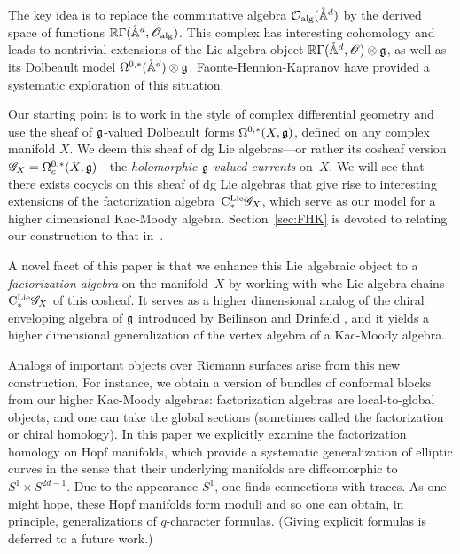 The key idea is to replace the commutative algebra $\mathcal O_{\rm alg}(\mathring{\mathbb A}^{d})$ by the derived space of functions $\mathbb R \Gamma(\mathring{\mathbb A}^{d}, \mathscr O_{\rm alg})$. 
This complex has interesting cohomology and leads to nontrivial extensions of the Lie algebra object $\mathbb R \Gamma(\mathring{\mathbb A}^{d}, \mathscr O) \otimes \mathfrak g$, as well as its Dolbeault model $\Omega^{0,*}(\mathring{\mathbb A}^d) \otimes \mathfrak g$.
Faonte-Hennion-Kapranov \cite{FHK} have provided a systematic exploration of this situation.

Our starting point is to work in the style of complex differential geometry and use the sheaf of $\mathfrak g$-valued Dolbeault forms $\Omega^{0,*}(X, \mathfrak g)$, defined on any complex manifold $X$. 
We deem this sheaf of dg Lie algebras---or rather its cosheaf version $\mathscr G_X = \Omega^{0,*}_c(X, \mathfrak g)$---the {\em holomorphic $\mathfrak g$-valued currents} on~$X$. 
We will see that there exists cocycls on this sheaf of dg Lie algebras that give rise to interesting extensions of the factorization algebra~${\rm C}^{\rm Lie}_*\mathscr G_X$,
which serve as our model for a higher dimensional Kac-Moody algebra. 
Section~\ref{sec:FHK} is devoted to relating our construction to that in~\cite{FHK}.

A novel facet of this paper is that we enhance this Lie algebraic object to a {\em factorization algebra} on the manifold~$X$
by working with whe Lie algebra chains ${\rm C}^{\rm Lie}_*\mathscr G_X$ of this cosheaf.
It serves as a higher dimensional analog of the chiral enveloping algebra of $\mathfrak g$ introduced by Beilinson and Drinfeld \cite{BD}, 
and it yields a higher dimensional generalization of the vertex algebra of a Kac-Moody algebra. 

Analogs of important objects over Riemann surfaces arise from this new construction.
For instance, we obtain a version of bundles of conformal blocks from our higher Kac-Moody algebras:
factorization algebras are local-to-global objects, and one can take the global sections
(sometimes called the factorization or chiral homology).
In this paper we explicitly examine the factorization homology on Hopf manifolds,
which provide a systematic generalization of elliptic curves 
in the sense that their underlying manifolds are diffeomorphic to $S^1 \times S^{2d-1}$.
Due to the appearance $S^1$, one finds connections with traces.
As one might hope, these Hopf manifolds form moduli and so one can obtain, in principle, generalizations of $q$-character formulas.
(Giving explicit formulas is deferred to a future work.)

